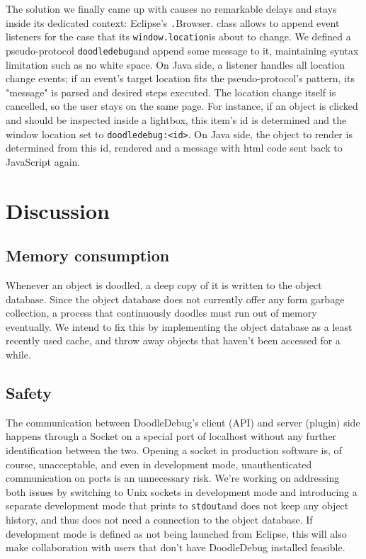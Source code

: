 \documentclass[english]{acm_proc_article-sp}
\begin{document}
The solution we finally came up with causes no remarkable delays and stays inside its dedicated context: Eclipse's \texttt.Browser. 
class allows to append event listeners for the case that its \texttt{window.location}is about to change. 
We defined a pseudo-protocol \texttt{doodledebug}and append some message to it, maintaining syntax limitation such as no white space. 
On Java side, a listener handles all location change events; if an event's target location fits the pseudo-protocol's pattern, its "message" is parsed and desired steps executed. 
The location change itself is cancelled, so the user stays on the same page. 
For instance, if an object is clicked and should be inspected inside a lightbox, this item's id is determined and the window location set to \texttt{doodledebug:<id>}. 
On Java side, the object to render is determined from this id, rendered and a message with html code sent back to JavaScript again.

\section{Discussion}
\subsection{Memory consumption}
Whenever an object is doodled, a deep copy of it is written to the object database. Since the object database does not currently offer any form garbage collection, a process that continuously doodles must run out of memory eventually. We intend to fix this by implementing the object database as a least recently used cache, and throw away objects that haven't been accessed for a while.

\subsection{Safety}
The communication between DoodleDebug's client (API) and server (plugin) side happens through a Socket on a special port of localhost without any further identification between the two. 
Opening a socket in production software is, of course, unacceptable, and even in development mode, unauthenticated communication on ports is an unnecessary risk. 
We're working on addressing both issues by switching to Unix sockets in development mode and introducing a separate development mode that prints to \texttt{stdout}and does not keep any object history, and thus does not need a connection to the object database. If development mode is defined as not being launched from Eclipse, this will also make collaboration with users that don't have DoodleDebug installed feasible.
\end{document}

